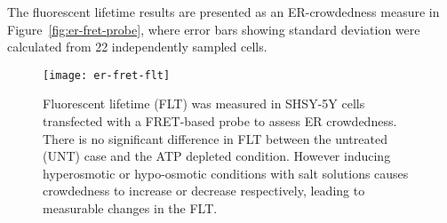 The fluorescent lifetime results are presented as an ER-crowdedness measure in Figure~\ref{fig:er-fret-probe}, where error bars showing standard deviation were calculated from 22 independently sampled cells. 

\begin{figure}[tbp]
\centering
\texttt{[image: er-fret-flt]}
\caption[Measuring fluorescent lifetime of a FRET-based probe is used to assess ER crowdedness]{Fluorescent lifetime (FLT) was measured in SHSY-5Y cells transfected with a FRET-based probe to assess ER crowdedness. There is no significant difference in FLT between the untreated (UNT) case and the ATP depleted condition. However inducing hyperosmotic or hypo-osmotic conditions with salt solutions causes crowdedness to increase or decrease respectively, leading to measurable changes in the FLT. } 
\label{fig:er-fret-flt}
\end{figure}